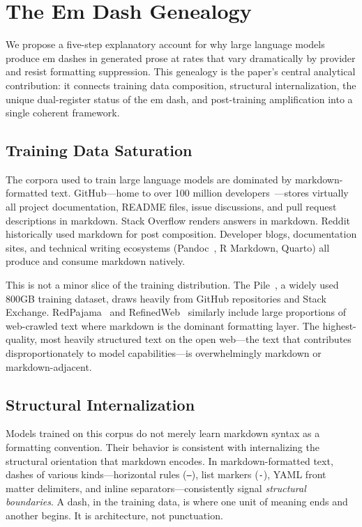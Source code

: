 \section{The Em Dash Genealogy}
\label{sec:genealogy}

We propose a five-step explanatory account for why large language models produce em dashes in generated prose at rates that vary dramatically by provider and resist formatting suppression. This genealogy is the paper's central analytical contribution: it connects training data composition, structural internalization, the unique dual-register status of the em dash, and post-training amplification into a single coherent framework.

\subsection{Training Data Saturation}

The corpora used to train large language models are dominated by markdown-formatted text. GitHub---home to over 100 million developers~\cite{github2024octoverse}---stores virtually all project documentation, README files, issue discussions, and pull request descriptions in markdown. Stack Overflow renders answers in markdown. Reddit historically used markdown for post composition. Developer blogs, documentation sites, and technical writing ecosystems (Pandoc~\cite{pandoc2024}, R Markdown, Quarto) all produce and consume markdown natively.

This is not a minor slice of the training distribution. The Pile~\cite{gao2020pile}, a widely used 800GB training dataset, draws heavily from GitHub repositories and Stack Exchange. RedPajama~\cite{together2023redpajama} and RefinedWeb~\cite{penedo2023refinedweb} similarly include large proportions of web-crawled text where markdown is the dominant formatting layer. The highest-quality, most heavily structured text on the open web---the text that contributes disproportionately to model capabilities---is overwhelmingly markdown or markdown-adjacent.

\subsection{Structural Internalization}

Models trained on this corpus do not merely learn markdown syntax as a formatting convention. Their behavior is consistent with internalizing the structural orientation that markdown encodes. In markdown-formatted text, dashes of various kinds---horizontal rules (\texttt{---}), list markers (\texttt{-}), YAML front matter delimiters, and inline separators---consistently signal \textit{structural boundaries}. A dash, in the training data, is where one unit of meaning ends and another begins. It is architecture, not punctuation.

